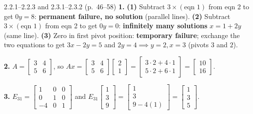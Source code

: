 \documentclass[11pt,a4paper,openany,oneside]{book}
\def\vect#1{#1}%
\def\mathbf#1{#1}%
\newcommand{\vect}[1]{\mathbf{#1}}
\numberwithin{equation}{chapter}
\begin{document}
\vfill
\begin{pageend_sol}{2.2.1--2.2.3 and 2.3.1--2.3.2 (p.\ 46--58)}
\textbf{1.} \textbf{(1)} Subtract $3\times(\text{eqn 1})$ from eqn 2 to get $0y = 8$: \textbf{permanent failure, no solution} (parallel lines). \textbf{(2)} Subtract $3\times(\text{eqn 1})$ from eqn 2 to get $0y = 0$: \textbf{infinitely many solutions} $x = 1 + 2y$ (same line). \textbf{(3)} Zero in first pivot position: \textbf{temporary failure}; exchange the two equations to get $3x-2y=5$ and $2y=4 \implies y=2, x=3$ (pivots $3$ and $2$).

\textbf{2.} $A = \begin{bmatrix}3 & 4\\5 & 6\end{bmatrix}$, so $A\vect{x} = \begin{bmatrix}3 & 4\\5 & 6\end{bmatrix}\begin{bmatrix}2\\1\end{bmatrix} = \begin{bmatrix}3\cdot 2 + 4\cdot 1\\5\cdot 2 + 6\cdot 1\end{bmatrix} = \begin{bmatrix}10\\16\end{bmatrix}$.

\textbf{3.} $E_{31} = \begin{bmatrix}1 & 0 & 0\\0 & 1 & 0\\-4 & 0 & 1\end{bmatrix}$ and $E_{31}\begin{bmatrix}1\\3\\9\end{bmatrix} = \begin{bmatrix}1\\3\\9 - 4(1)\end{bmatrix} = \begin{bmatrix}1\\3\\5\end{bmatrix}$.
\end{pageend_sol}
\clearpage
\end{document}
